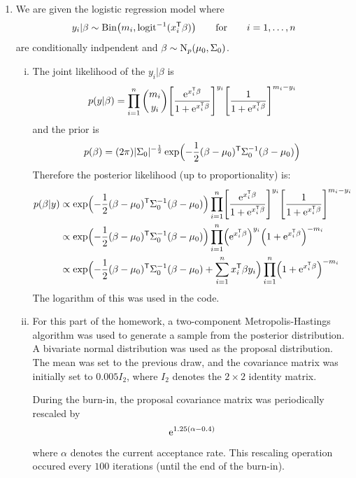 \begin{enumerate}
\item
We are given the logistic regression model where
\[
    y_i \vert \beta \sim
    \operatorname{Bin} \bigl( m_i, \operatorname{logit}^{-1}(x_i^\mathsf{T} \beta) \bigr)
    \qquad\text{for}\qquad
    i = 1, \ldots, n
\]
are conditionally indpendent and $\beta \sim \operatorname{N}_p(\mu_0, \Sigma_0)$.
\begin{enumerate}[i)]
    \item
    The joint likelihood of the $y_i \vert \beta$ is
    \[
        p(y \vert \beta)
        =
        \prod_{i=1}^n \binom{m_i}{y_i}
        \Biggl[ \frac{\operatorname{e}^{x_i^\mathsf{T} \beta}}{1 + \operatorname{e}^{x_i^\mathsf{T} \beta}} \Biggr]^{y_i}
        \Biggl[ \frac{1}{1 + \operatorname{e}^{x_i^\mathsf{T} \beta}} \Biggr]^{m_i - y_i}
    \]
    and the prior is
    \[
        p(\beta)
        =
        (2\pi) \lvert\Sigma_0\rvert^{-\frac{1}{2}}
        \exp \Bigl(
        -\frac{1}{2}(\beta - \mu_0)^\mathsf{T} \Sigma_0^{-1} (\beta - \mu_0)
        \Bigr)
    \]
    Therefore the posterior likelihood (up to proportionality) is:
    \begin{align*}
        p(\beta \vert y)
        &\propto
        \exp \Bigl(
        -\frac{1}{2}(\beta - \mu_0)^\mathsf{T} \Sigma_0^{-1} (\beta - \mu_0)
        \Bigr)
        \prod_{i=1}^n
        \Biggl[ \frac{\operatorname{e}^{x_i^\mathsf{T} \beta}}{1 + \operatorname{e}^{x_i^\mathsf{T} \beta}} \Biggr]^{y_i}
        \Biggl[ \frac{1}{1 + \operatorname{e}^{x_i^\mathsf{T} \beta}} \Biggr]^{m_i - y_i}
        \\ &\propto
        \exp \Bigl(
        -\frac{1}{2}(\beta - \mu_0)^\mathsf{T} \Sigma_0^{-1} (\beta - \mu_0)
        \Bigr)
        \prod_{i=1}^n
        \Bigl( \operatorname{e}^{x_i^\mathsf{T} \beta} \Bigr)^{y_i}
        \Bigl( 1 + \operatorname{e}^{x_i^\mathsf{T} \beta} \Bigr)^{-m_i}
        \\ &\propto
        \exp \Bigl(
        -\frac{1}{2}(\beta - \mu_0)^\mathsf{T} \Sigma_0^{-1} (\beta - \mu_0)
        + \sum_{i=1}^n x_i^\mathsf{T} \beta y_i
        \Bigr)
        \prod_{i=1}^n
        \Bigl( 1 + \operatorname{e}^{x_i^\mathsf{T} \beta} \Bigr)^{-m_i}
    \end{align*}
    The logarithm of this was used in the code.

    \item
    For this part of the homework, a two-component Metropolis-Hastings
    algorithm was used to generate a sample from the posterior distribution.
    A bivariate normal distribution was used as the proposal distribution.
    The mean was set to the previous draw, and the covariance matrix was
    initially set to $0.005 I_2$, where $I_2$ denotes the $2 \times 2$ identity
    matrix.

    During the burn-in, the proposal covariance matrix was periodically
    rescaled by
    \[
        \operatorname{e}^{1.25 (\alpha - 0.4)}
    \]
    where $\alpha$ denotes the current acceptance rate. 
    This rescaling operation occured every $100$ iterations (until the end of
    the burn-in).


\end{enumerate}
\end{enumerate}
